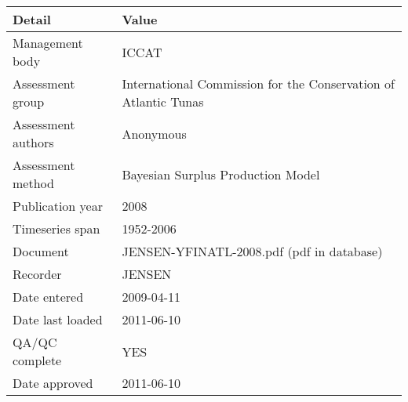 \begin{table}[htb]
\centering
\begin{tabular}{lp{7cm}}
\toprule
Detail & Value \\
\midrule
Management body    & ICCAT                                                           \\
Assessment group   & International Commission for the Conservation of Atlantic Tunas \\
Assessment authors & Anonymous                                                       \\
Assessment method  & Bayesian Surplus Production Model                               \\
Publication year   & 2008                                                            \\
Timeseries span    & 1952-2006                                                       \\
Document           & JENSEN-YFINATL-2008.pdf (pdf in database)                       \\
Recorder           & JENSEN                                                          \\
Date entered       & 2009-04-11                                                      \\
Date last loaded   & 2011-06-10                                                      \\
QA/QC complete     & YES                                                             \\
Date approved      & 2011-06-10                                                      \\
\bottomrule
\end{tabular}
\label{tab:assessdet}
\end{table}
